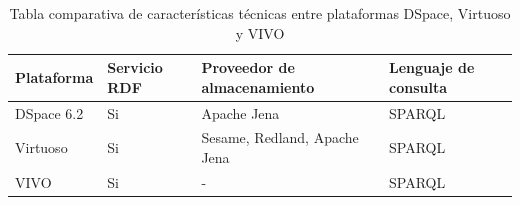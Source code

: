 \begin{table}[htbp]
    \begin{center}
    \caption{Tabla comparativa de caracter\'isticas t\'ecnicas entre plataformas DSpace, Virtuoso y VIVO}
    \begin{tabular}{| p{4cm}| p{3cm} |p{4cm} | p{3cm} |}
    \hline
    \centering \textbf{Plataforma} & \textbf{Servicio RDF} & \textbf{Proveedor de almacenamiento} & \textbf{Lenguaje de consulta} \\
    \hline \hline
    DSpace 6.2 & Si & Apache Jena & SPARQL \\ \hline
    Virtuoso & Si & Sesame, Redland, Apache Jena & SPARQL \\ \hline
    VIVO & Si & - & SPARQL \\ \hline
    \end{tabular}
    \label{tabla_comparativa}
    \end{center}
\end{table}